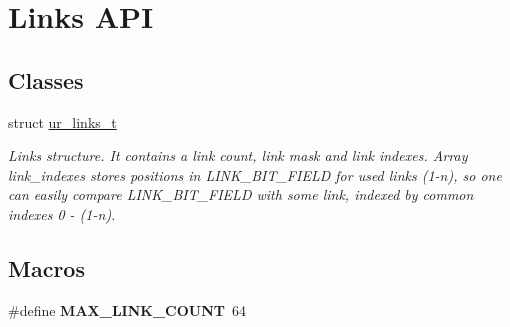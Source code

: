 \hypertarget{group__ur__links}{}\section{Links A\+PI}
\label{group__ur__links}
\subsection*{Classes}
\begin{DoxyCompactItemize}
\item 
struct \hyperlink{structur__links__t}{ur\+\_\+links\+\_\+t}
\begin{DoxyCompactList}\small\item\em Links structure. It contains a link count, link mask and link indexes. Array link\+\_\+indexes stores positions in L\+I\+N\+K\+\_\+\+B\+I\+T\+\_\+\+F\+I\+E\+LD for used links (1-\/n), so one can easily compare L\+I\+N\+K\+\_\+\+B\+I\+T\+\_\+\+F\+I\+E\+LD with some link, indexed by common indexes 0 -\/ (1-\/n). \end{DoxyCompactList}\end{DoxyCompactItemize}
\subsection*{Macros}
\begin{DoxyCompactItemize}
\item 
\#define {\bfseries M\+A\+X\+\_\+\+L\+I\+N\+K\+\_\+\+C\+O\+U\+NT}~64\hypertarget{group__ur__links_gabd556824006b81cd58ddb67907d86ca8}{}\label{group__ur__links_gabd556824006b81cd58ddb67907d86ca8}

\end{DoxyCompactItemize}
